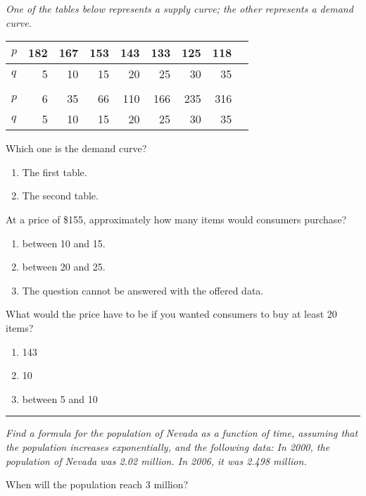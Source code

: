 \documentclass[12pt]{article}
\begin{document}
\bigskip
{\problem[15 pts] \em One of the tables below represents a supply
  curve; the other represents a demand curve.}
\begin{center}
\begin{tabular}{l|r|r|r|r|r|r|r|r|}
\hline
$p$ & 182 & 167 & 153 & 143 & 133 & 125 & 118 \\
\hline
$q$ & 5 & 10 & 15 & 20 & 25 & 30 & 35 \\
\hline \\



\hline
$p$ & 6 & 35 & 66 & 110 & 166 & 235 & 316 \\
\hline
$q$ & 5 & 10 & 15 & 20 & 25 & 30 & 35 \\
\hline
\end{tabular}
\end{center}
\noindent
Which  one is the demand curve?
\begin{enumerate}
\item The first table.
\item The second table.
\end{enumerate}
\noindent
At a price of \$155, approximately how many items would consumers
purchase?
\begin{enumerate}
\item between 10 and 15.
\item between 20 and 25.
\item The question cannot be answered with the offered data.
\end{enumerate}
\noindent
What would the price have to be if you wanted consumers to buy at
least 20 items?
\begin{enumerate}
\item 143
\item 10
\item between 5 and 10
\end{enumerate}
\hrule
{\problem[10 pts] \em Find a formula for the population of Nevada as a
  function of time, assuming that the population increases
  exponentially, and the following data:  In 2000, the population of
  Nevada was 2.02 million.  In 2006, it was 2.498 million.}
\vspace{2.5cm}
\begin{flushright}
\end{flushright}
\noindent
When will the population reach 3 million?
\vspace{2.5cm}
\begin{flushright}
\end{flushright}
\end{document}
